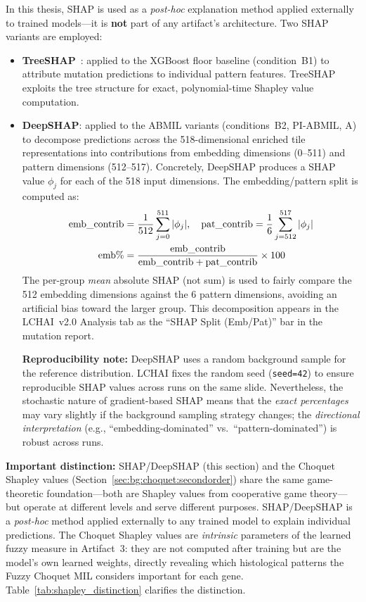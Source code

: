 In this thesis, SHAP is used as a \emph{post-hoc} explanation method
applied externally to trained models---it is \textbf{not} part of any
artifact's architecture.
Two SHAP variants are employed:
\begin{itemize}
    \item \textbf{TreeSHAP}~\cite{lundberg2020treeshap}: applied to the
    XGBoost floor baseline (condition~B1) to attribute mutation predictions to
    individual pattern features.  TreeSHAP exploits the tree structure
    for exact, polynomial-time Shapley value computation.
    \item \textbf{DeepSHAP}: applied to the ABMIL variants
    (conditions~B2, PI-ABMIL, A) to decompose predictions across the
    518-dimensional enriched tile representations into contributions from
    embedding dimensions (0--511) and pattern dimensions (512--517).
    Concretely, DeepSHAP produces a SHAP value $\phi_j$ for each of
    the 518 input dimensions.
    The embedding/pattern split is computed as:
    \begin{align}
    \text{emb\_contrib} &= \frac{1}{512}\sum_{j=0}^{511} |\phi_j|, \quad
    \text{pat\_contrib} = \frac{1}{6}\sum_{j=512}^{517} |\phi_j| \label{eq:shap_split} \\
    \text{emb\%} &= \frac{\text{emb\_contrib}}{\text{emb\_contrib} + \text{pat\_contrib}} \times 100 \notag
    \end{align}
    The per-group \emph{mean} absolute SHAP (not sum) is used to
    fairly compare the 512 embedding dimensions against the 6 pattern
    dimensions, avoiding an artificial bias toward the larger group.
    This decomposition appears in the LCHAI~v2.0 Analysis tab as
    the ``SHAP Split (Emb/Pat)'' bar in the mutation report.

    \textbf{Reproducibility note:} DeepSHAP uses a random background
    sample for the reference distribution.
    LCHAI fixes the random seed (\texttt{seed=42}) to ensure
    reproducible SHAP values across runs on the same slide.
    Nevertheless, the stochastic nature of gradient-based SHAP
    means that the \emph{exact percentages} may vary slightly if the
    background sampling strategy changes; the
    \emph{directional interpretation} (e.g., ``embedding-dominated''
    vs.\ ``pattern-dominated'') is robust across runs.
\end{itemize}

\textbf{Important distinction:} SHAP/DeepSHAP (this section) and the
Choquet Shapley values (Section~\ref{sec:bg:choquet:secondorder}) share
the same game-theoretic foundation---both are Shapley values from
cooperative game theory---but operate at different levels and serve
different purposes.
SHAP/DeepSHAP is a \emph{post-hoc} method applied externally to any
trained model to explain individual predictions.
The Choquet Shapley values are \emph{intrinsic} parameters of the
learned fuzzy measure in Artifact~3: they are not computed after
training but are the model's own learned weights, directly revealing
which histological patterns the Fuzzy Choquet MIL considers important
for each gene.
Table~\ref{tab:shapley_distinction} clarifies the distinction.

